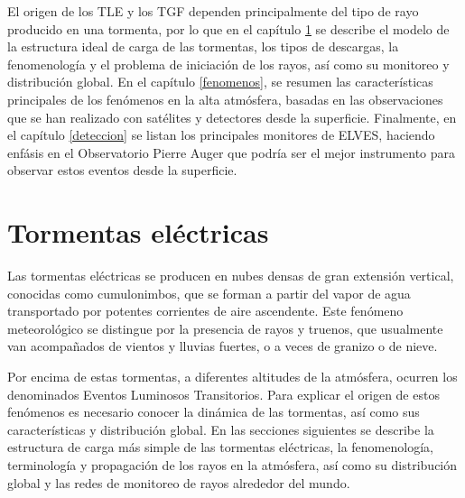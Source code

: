 \documentclass[11pt,oneside,openany,letter]{book}
\begin{document}
El origen de los TLE y los TGF dependen principalmente del tipo de rayo producido en una tormenta, por lo que en el cap\'itulo \ref{tormentas} se describe el modelo de la estructura ideal de carga de las tormentas, los tipos de descargas, la fenomenolog\'ia y el problema de iniciaci\'on de los rayos, as\'i como su monitoreo y distribuci\'on global. En el cap\'itulo \ref{fenomenos}, se resumen las características principales de los fenómenos en la alta atmósfera, basadas en las observaciones que se han realizado con sat\'elites y detectores desde la superficie. Finalmente, en el capítulo \ref{deteccion} se listan los principales monitores de ELVES, haciendo enf\'asis en el Observatorio Pierre Auger que podr\'ia ser el mejor instrumento para observar estos eventos desde la superficie.  

\chapter{Tormentas eléctricas}\label{tormentas}
Las tormentas eléctricas se producen en nubes densas de gran extensión vertical, conocidas como cumulonimbos, que se forman a partir del vapor de agua transportado por potentes corrientes de aire ascendente. Este fenómeno meteorológico se distingue por la presencia de rayos y truenos, que usualmente van acompañados de vientos y lluvias fuertes, o a veces de granizo o de nieve. 

Por encima de estas tormentas, a diferentes altitudes de la atmósfera, ocurren los denominados Eventos Luminosos Transitorios. Para explicar el origen de estos fenómenos es necesario conocer la dinámica de las tormentas, así como sus características y distribución global. En las secciones siguientes se describe la estructura de carga más simple de las tormentas eléctricas, la fenomenología, terminología y propagación de los rayos en la atmósfera, así como su distribución global y las redes de monitoreo de rayos alrededor del mundo.  
\end{document}
